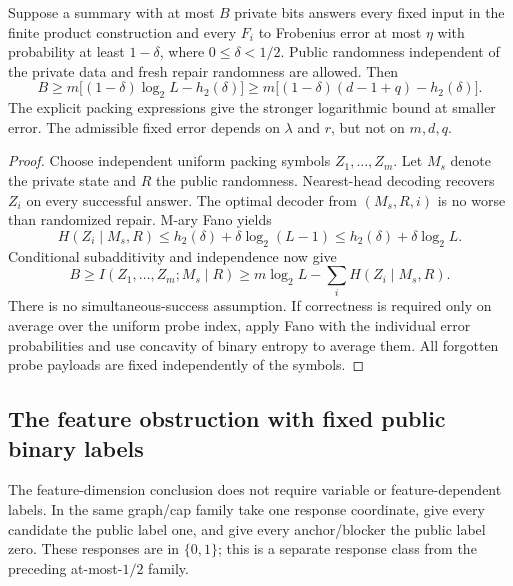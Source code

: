 \begin{theorem}
Suppose a summary with at most $B$ private bits answers every fixed input
in the finite product construction and every $F_i$ to Frobenius error at
most $\eta$ with probability at least $1-\delta$, where
$0\le\delta<1/2$.  Public randomness independent of the private data and
fresh repair randomness are allowed.  Then
\[
 B\ge m\bigl[(1-\delta)\log_2 L-h_2(\delta)\bigr]
   \ge m\bigl[(1-\delta)(d-1+q)-h_2(\delta)\bigr].
\]
The explicit packing expressions give the stronger logarithmic bound at
smaller error.  The admissible fixed error depends on $\lambda$ and $r$,
but not on $m,d,q$.
\end{theorem}
\begin{proof}
Choose independent uniform packing symbols $Z_1,\ldots,Z_m$.  Let $M_s$
denote the private state and $R$ the public randomness.  Nearest-head
decoding recovers $Z_i$ on every successful answer.  The optimal decoder
from $(M_s,R,i)$ is no worse than randomized repair.  M-ary Fano yields
\[
 H(Z_i\mid M_s,R)\le h_2(\delta)+\delta\log_2(L-1)
                      \le h_2(\delta)+\delta\log_2 L.
\]
Conditional subadditivity and independence now give
\[
 B\ge I(Z_1,\ldots,Z_m;M_s\mid R)
 \ge m\log_2L-\sum_i H(Z_i\mid M_s,R).
\]
There is no simultaneous-success assumption.  If correctness is required
only on average over the uniform probe index, apply Fano with the individual
error probabilities and use concavity of binary entropy to average them.
All forgotten probe payloads are fixed independently of the symbols.
\end{proof}

\subsection{The feature obstruction with fixed public binary labels}
The feature-dimension conclusion does not require variable or
feature-dependent labels.  In the same graph/cap family take one response
coordinate, give every candidate the public label one, and give every
anchor/blocker the public label zero.  These responses are in $\{0,1\}$;
this is a separate response class from the preceding at-most-$1/2$ family.


